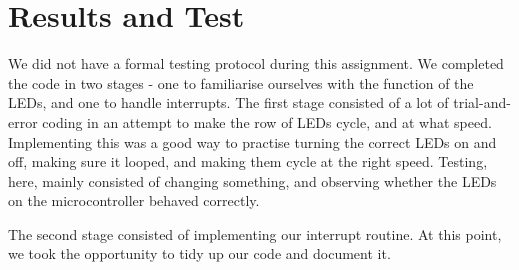 \section{Results and Test}
We did not have a formal testing protocol during this assignment. We completed the code in two stages - one to familiarise ourselves with the function of the LEDs, and one to handle interrupts. The first stage consisted of a lot of trial-and-error coding in an attempt to make the row of LEDs cycle, and at what speed. Implementing this was a good way to practise turning the correct LEDs on and off, making sure it looped, and making them cycle at the right speed. Testing, here, mainly consisted of changing something, and observing whether the LEDs on the microcontroller behaved correctly.

The second stage consisted of implementing our interrupt routine. At this point, we took the opportunity to tidy up our code and document it.